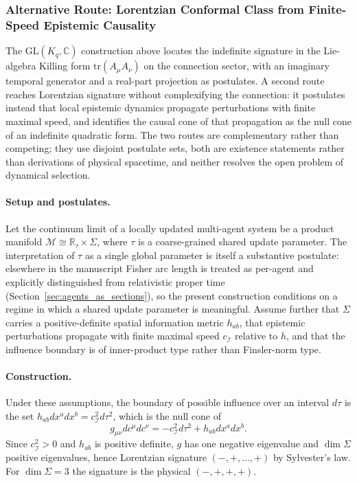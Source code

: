 \documentclass[11pt]{article}
\begin{document}
\subsubsection{Alternative Route: Lorentzian Conformal Class from Finite-Speed Epistemic Causality}
\label{sec:causal_cone_route}

The $\mathrm{GL}(K_q,\mathbb{C})$ construction above locates the indefinite signature in the Lie-algebra Killing form $\mathrm{tr}(A_\mu A_\nu)$ on the connection sector, with an imaginary temporal generator and a real-part projection as postulates. A second route reaches Lorentzian signature without complexifying the connection: it postulates instead that local epistemic dynamics propagate perturbations with finite maximal speed, and identifies the causal cone of that propagation as the null cone of an indefinite quadratic form. The two routes are complementary rather than competing; they use disjoint postulate sets, both are existence statements rather than derivations of physical spacetime, and neither resolves the open problem of dynamical selection.

\paragraph{Setup and postulates.}
Let the continuum limit of a locally updated multi-agent system be a product manifold $\mathcal{M} \cong \mathbb{R}_\tau \times \Sigma$, where $\tau$ is a coarse-grained shared update parameter. The interpretation of $\tau$ as a single global parameter is itself a substantive postulate: elsewhere in the manuscript Fisher arc length is treated as per-agent and explicitly distinguished from relativistic proper time (Section~\ref{sec:agents_as_sections}), so the present construction conditions on a regime in which a shared update parameter is meaningful. Assume further that $\Sigma$ carries a positive-definite spatial information metric $h_{ab}$, that epistemic perturbations propagate with finite maximal speed $c_\mathcal{I}$ relative to $h$, and that the influence boundary is of inner-product type rather than Finsler-norm type.

\paragraph{Construction.}
Under these assumptions, the boundary of possible influence over an interval $d\tau$ is the set $h_{ab} dx^a dx^b = c_\mathcal{I}^2 d\tau^2$, which is the null cone of
\begin{equation}
g_{\mu\nu} dc^\mu dc^\nu = -c_\mathcal{I}^2 d\tau^2 + h_{ab} dx^a dx^b.
\label{eq:causal_cone_metric}
\end{equation}
Since $c_\mathcal{I}^2 > 0$ and $h_{ab}$ is positive definite, $g$ has one negative eigenvalue and $\dim\Sigma$ positive eigenvalues, hence Lorentzian signature $(-,+,\ldots,+)$ by Sylvester's law. For $\dim\Sigma = 3$ the signature is the physical $(-,+,+,+)$.
\end{document}
